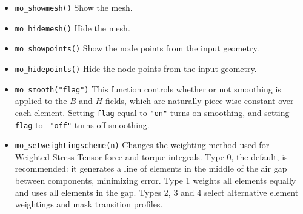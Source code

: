 \begin{itemize}
\item{\verb+mo_showmesh()+} Show the mesh.
\item{\verb+mo_hidemesh()+} Hide the mesh.
\item{\verb+mo_showpoints()+} Show the node points from the input geometry.
\item{\verb+mo_hidepoints()+} Hide the node points from the input geometry.
\item{\tt mo\_smooth("flag")} This function controls whether or not smoothing
is applied to the $B$ and $H$ fields, which are naturally
piece-wise constant over each element.  Setting {\tt flag} equal to
{\tt "on"} turns on smoothing, and setting {\tt flag} to {\tt
"off"} turns off smoothing.
\item{\tt mo\_setweightingscheme(n)} Changes the weighting method used for Weighted Stress Tensor force and torque integrals. Type 0, the default, is recommended: it generates a line of elements in the middle of the air gap between components, minimizing error. Type 1 weights all elements equally and uses all elements in the gap. Types 2, 3 and 4 select alternative element weightings and mask transition profiles.


\end{itemize}

